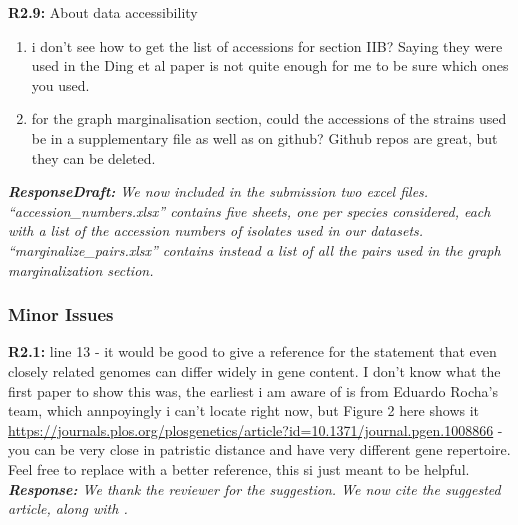 \documentclass[aps,rmp,onecolumn]{revtex4-1}
\newcommand{\Marco}[1]{{\color{gray}Marco: #1}}
\newcommand{\Liam}[1]{{\color{teal}Liam: #1}}
\newcommand{\reviewer}[2]{\textbf{#1:} #2\vskip 5mm}
\newcommand{\response}[1]{{\it {\color{response}\textbf{Response:} #1}}\vskip 5mm}
\newcommand{\responsedraft}[1]{{\it {\color{purple}\textbf{ResponseDraft:} #1}}\vskip 5mm}
\begin{document}
\reviewer{R2.9}{About data accessibility
      \begin{enumerate}
            \item i don't see how to get the list of accessions for section IIB? Saying they were used in the Ding et al paper is not quite enough for me to be sure which ones you used.
            \item for the graph marginalisation section, could the accessions of the strains used be in a supplementary file as well as on github? Github repos are great, but they can be deleted.
      \end{enumerate}}
\responsedraft{We now included in the submission two excel files. ``accession\_numbers.xlsx'' contains five sheets, one per species considered, each with a list of the accession numbers of isolates used in our datasets. ``marginalize\_pairs.xlsx'' contains instead a list of all the pairs used in the graph marginalization section.
}

\subsubsection*{Minor Issues}

\reviewer{R2.1}{line 13 - it would be good to give a reference for the statement that even closely related genomes can differ widely in gene content.
      I don't know what the first paper to show this was, the earliest i am aware of is from Eduardo Rocha's team, which annpoyingly i can't locate right now, but Figure 2 here shows it \url{https://journals.plos.org/plosgenetics/article?id=10.1371/journal.pgen.1008866} \cite{touchon2020phylogenetic} - you can be very close in patristic distance and have very different gene repertoire.
      Feel free to replace with a better reference, this si just meant to be helpful.}
\response{We thank the reviewer for the suggestion. We now cite the suggested article, along with \cite{touchon2009organised,doolittle2009origin}.}
\end{document}
